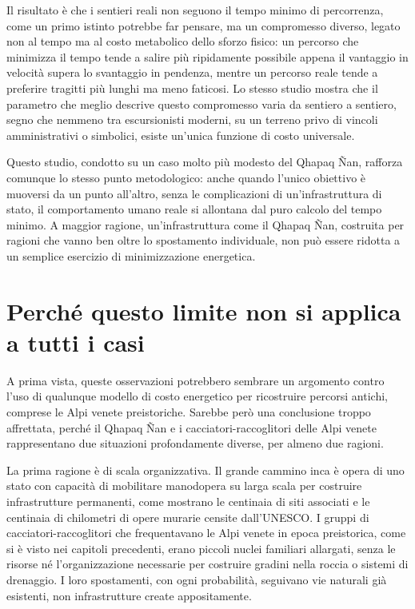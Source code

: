 Il risultato è che i sentieri reali non seguono il tempo minimo di percorrenza, come un primo istinto potrebbe far pensare, ma un compromesso diverso, legato non al tempo ma al costo metabolico dello sforzo fisico: un percorso che minimizza il tempo tende a salire più ripidamente possibile appena il vantaggio in velocità supera lo svantaggio in pendenza, mentre un percorso reale tende a preferire tragitti più lunghi ma meno faticosi. Lo stesso studio mostra che il parametro che meglio descrive questo compromesso varia da sentiero a sentiero, segno che nemmeno tra escursionisti moderni, su un terreno privo di vincoli amministrativi o simbolici, esiste un'unica funzione di costo universale.

Questo studio, condotto su un caso molto più modesto del Qhapaq Ñan, rafforza comunque lo stesso punto metodologico: anche quando l'unico obiettivo è muoversi da un punto all'altro, senza le complicazioni di un'infrastruttura di stato, il comportamento umano reale si allontana dal puro calcolo del tempo minimo. A maggior ragione, un'infrastruttura come il Qhapaq Ñan, costruita per ragioni che vanno ben oltre lo spostamento individuale, non può essere ridotta a un semplice esercizio di minimizzazione energetica.

\section{Perché questo limite non si applica a tutti i casi}

A prima vista, queste osservazioni potrebbero sembrare un argomento contro l'uso di qualunque modello di costo energetico per ricostruire percorsi antichi, comprese le Alpi venete preistoriche. Sarebbe però una conclusione troppo affrettata, perché il Qhapaq Ñan e i cacciatori-raccoglitori delle Alpi venete rappresentano due situazioni profondamente diverse, per almeno due ragioni.

La prima ragione è di scala organizzativa. Il grande cammino inca è opera di uno stato con capacità di mobilitare manodopera su larga scala per costruire infrastrutture permanenti, come mostrano le centinaia di siti associati e le centinaia di chilometri di opere murarie censite dall'UNESCO. I gruppi di cacciatori-raccoglitori che frequentavano le Alpi venete in epoca preistorica, come si è visto nei capitoli precedenti, erano piccoli nuclei familiari allargati, senza le risorse né l'organizzazione necessarie per costruire gradini nella roccia o sistemi di drenaggio. I loro spostamenti, con ogni probabilità, seguivano vie naturali già esistenti, non infrastrutture create appositamente.

